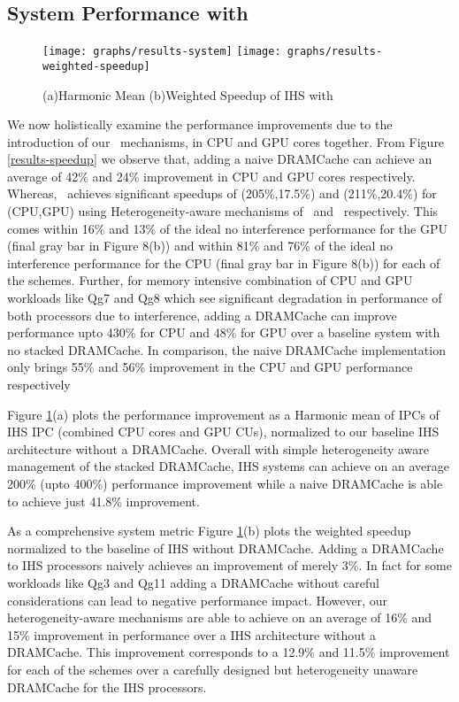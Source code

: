 \subsection{System Performance with \cachename}
\begin{figure}[!htb]
	\centering
	\texttt{[image: graphs/results-system]}
	\texttt{[image: graphs/results-weighted-speedup]}
	\caption{(a)Harmonic Mean (b)Weighted Speedup of IHS with \cachename}
	\label{results-system}
\end{figure}
We now holistically examine the performance improvements due to the introduction of our \cachename\ mechanisms, in  CPU and GPU cores together. From Figure \ref{results-speedup} we observe that, adding a naive DRAMCache can achieve an average of 42\% and 24\% improvement in CPU and GPU cores respectively. Whereas, \cachename\ achieves significant speedups of (205\%,17.5\%) and (211\%,20.4\%) for (CPU,GPU) using Heterogeneity-aware mechanisms of \bypassname\ and \chaining\ respectively. This comes within 16\% and 13\% of the ideal no interference performance for the GPU (final gray bar in Figure 8(b)) and within 81\% and 76\% of the ideal no interference performance for the CPU (final gray bar in Figure 8(b)) for each of the schemes. Further, for memory intensive combination of CPU and GPU workloads like Qg7 and Qg8 which see significant degradation in performance of both processors due to interference, adding a DRAMCache can improve performance upto 430\% for CPU and 48\% for GPU over a baseline system with no stacked DRAMCache. In comparison, the naive DRAMCache implementation only brings 55\% and 56\% improvement in the CPU and GPU performance respectively
\par Figure \ref{results-system}(a) plots the performance improvement as a Harmonic mean of IPCs of IHS IPC (combined CPU cores and GPU CUs), normalized to our baseline IHS architecture without a DRAMCache. Overall with simple heterogeneity aware management of the stacked DRAMCache, IHS systems can achieve on an average 200\% (upto 400\%) performance improvement while a naive DRAMCache is able to achieve just 41.8\% improvement.
\par As a comprehensive system metric Figure \ref{results-system}(b) plots the weighted speedup normalized to the baseline of IHS without DRAMCache. Adding a DRAMCache to IHS processors naively achieves an improvement of merely 3\%. In fact for some workloads like Qg3 and Qg11 adding a DRAMCache without careful considerations can lead to negative performance impact. However, our heterogeneity-aware mechanisms are able to achieve on an average of 16\% and 15\%  improvement in performance over a IHS architecture without a DRAMCache. This improvement corresponds to a 12.9\% and 11.5\% improvement for each of the schemes over a carefully designed but heterogeneity unaware DRAMCache for the IHS processors.


